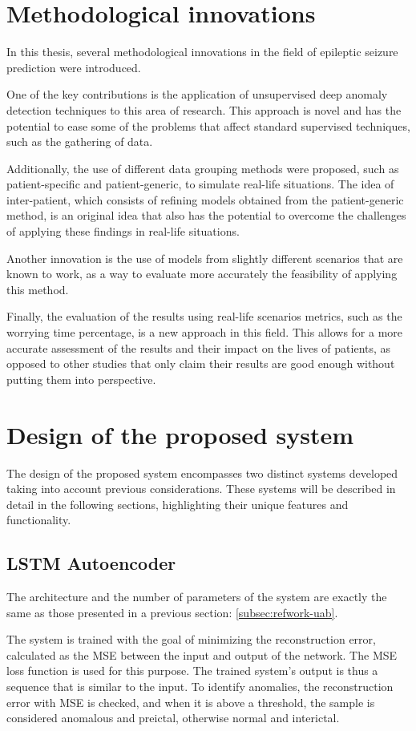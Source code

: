 \section{Methodological innovations}
In this thesis, several methodological innovations in the field of epileptic seizure prediction were introduced. 

One of the key contributions is the application of unsupervised deep anomaly detection techniques to this area of research. This approach is novel and has the potential to ease some of the problems that affect standard supervised techniques, such as the gathering of data. 

Additionally, the use of different data grouping methods were proposed, such as patient-specific and patient-generic, to simulate real-life situations. The idea of inter-patient, which consists of refining models obtained from the patient-generic method, is an original idea that also has the potential to overcome the challenges of applying these findings in real-life situations. 

Another innovation is the use of models from slightly different scenarios that are known to work, as a way to evaluate more accurately the feasibility of applying this method. 

Finally, the evaluation of the results using real-life scenarios metrics, such as the worrying time percentage, is a new approach in this field. This allows for a more accurate assessment of the results and their impact on the lives of patients, as opposed to other studies that only claim their results are good enough without putting them into perspective.

\section{Design of the proposed system}
The design of the proposed system encompasses two distinct systems developed taking into account previous considerations. These systems will be described in detail in the following sections, highlighting their unique features and functionality.

\subsection{LSTM Autoencoder} \label{subsec:lstm}
The architecture and the number of parameters of the system are exactly the same as those presented in a previous section: \ref{subsec:refwork-uab}.

The system is trained with the goal of minimizing the reconstruction error, calculated as the \gls{MSE} between the input and output of the network. The \gls{MSE} loss function is used for this purpose. 
The trained system's output is thus a sequence that is similar to the input. To identify anomalies, the reconstruction error with \gls{MSE} is checked, and when it is above a threshold, the sample is considered anomalous and preictal, otherwise normal and interictal. 

